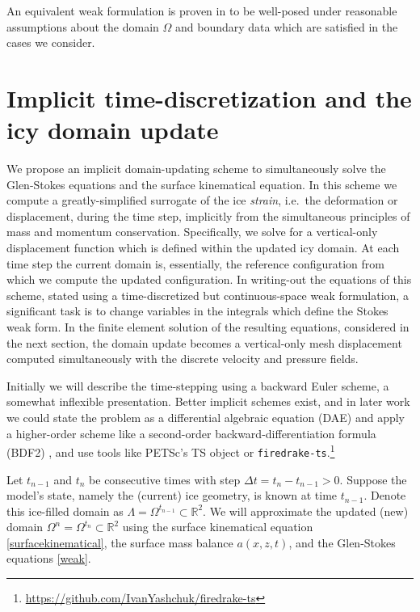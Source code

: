 \documentclass[letterpaper,final,12pt,reqno]{amsart}
\newcommand{\RR}{\mathbb{R}}
\begin{document}
An equivalent weak formulation is proven in \cite[Theorem 3.8]{JouvetRappaz2011} to be well-posed under reasonable assumptions about the domain $\Omega$ and boundary data which are satisfied in the cases we consider.


\section{Implicit time-discretization and the icy domain update} \label{sec:implicitstep}

We propose an implicit domain-updating scheme to simultaneously solve the Glen-Stokes equations and the surface kinematical equation.  In this scheme we compute a greatly-simplified surrogate of the ice \emph{strain}, i.e.~the deformation or displacement, during the time step, implicitly from the simultaneous principles of mass and momentum conservation.  Specifically, we solve for a vertical-only displacement function which is defined within the updated icy domain.  At each time step the current domain is, essentially, the reference configuration from which we compute the updated configuration.  In writing-out the equations of this scheme, stated using a time-discretized but continuous-space weak formulation, a significant task is to change variables in the integrals which define the Stokes weak form.  In the finite element solution of the resulting equations, considered in the next section, the domain update becomes a vertical-only mesh displacement computed simultaneously with the discrete velocity and pressure fields.

Initially we will describe the time-stepping using a backward Euler scheme, a somewhat inflexible presentation.  Better implicit schemes exist, and in later work we could state the problem as a differential algebraic equation (DAE) and apply a higher-order scheme like a second-order backward-differentiation formula (BDF2) \cite{AscherPetzold1998}, and use tools like PETSc's TS object \cite{Balayetal2020,BuelerBook} or \texttt{firedrake-ts}.\footnote{\url{https://github.com/IvanYashchuk/firedrake-ts}}

Let $t_{n-1}$ and $t_n$ be consecutive times with step $\Delta t = t_n - t_{n-1} > 0$.  Suppose the model's state, namely the (current) ice geometry, is known at time $t_{n-1}$.  Denote this ice-filled domain as $\Lambda = \Omega^{t_{n-1}} \subset \RR^2$.  We will approximate the updated (new) domain $\Omega^n = \Omega^{t_n} \subset \RR^2$ using the surface kinematical equation \eqref{surfacekinematical}, the surface mass balance $a(x,z,t)$, and the Glen-Stokes equations \eqref{weak}.
\end{document}
